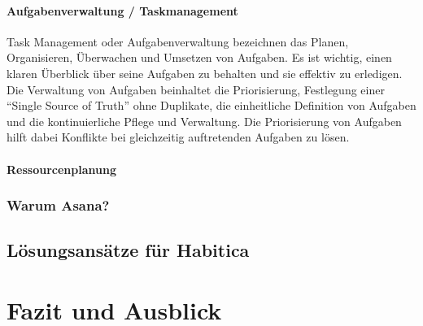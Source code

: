 \documentclass[sigconf, nonacm]{acmart}
\begin{document}
\paragraph{Aufgabenverwaltung / Taskmanagement}
Task Management oder Aufgabenverwaltung bezeichnen das Planen, Organisieren, Überwachen und Umsetzen von Aufgaben. Es ist wichtig, einen klaren Überblick über seine Aufgaben zu behalten und sie effektiv zu erledigen. 
Die Verwaltung von Aufgaben beinhaltet die Priorisierung, Festlegung einer \enquote{Single Source of Truth} ohne Duplikate, die einheitliche Definition von Aufgaben und die kontinuierliche Pflege und Verwaltung. 
Die Priorisierung von Aufgaben hilft dabei Konflikte bei gleichzeitig auftretenden Aufgaben zu lösen.~\cite{venzmer_task_2020}
\paragraph{Ressourcenplanung}

\subsubsection{Warum Asana?}

\subsection{Lösungsansätze für Habitica}\label{sec:solutions_for_habitica}

\section{Fazit und Ausblick}
\end{document}
